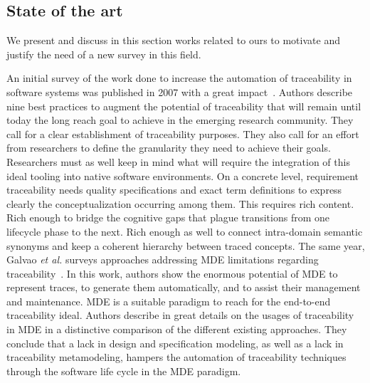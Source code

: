 \subsection{State of the art} \label{sec:rw}
We present and discuss in this section works related to ours to motivate and justify the need of a new survey in this field. %

An initial survey of the work done to increase the automation of traceability in software systems was published in 2007 with a great impact~\cite{clelandhuang2007bestPracticeForAutomatedTraceability}. Authors describe nine best practices to augment the potential of traceability that will remain until today the long reach goal to achieve in the emerging research community. They call for a clear establishment of traceability purposes. They also call for an effort from researchers to define the granularity they need to achieve their goals. Researchers must as well keep in mind what will require the integration of this ideal tooling into native software environments. 
On a concrete level, requirement traceability needs quality specifications and exact term definitions to express clearly the conceptualization occurring among them. This requires rich content. Rich enough to bridge the cognitive gaps that plague transitions from one lifecycle phase to the next. Rich enough as well to connect intra-domain semantic synonyms and keep a coherent hierarchy between traced concepts. 
The same year, Galvao \textit{et al.} surveys approaches addressing MDE limitations regarding traceability~\cite{galvao2007-survey-traceability-in-MDE}. In this work, authors show the enormous potential of MDE to represent traces, to generate them automatically, and to assist their management and maintenance. MDE is a suitable paradigm to reach for the end-to-end traceability ideal. Authors describe in great details on the usages of traceability in MDE in a distinctive comparison of the different existing approaches. They conclude that a lack in design and specification modeling, as well as a lack in traceability metamodeling, hampers the automation of traceability techniques through the software life cycle in the MDE paradigm. 

